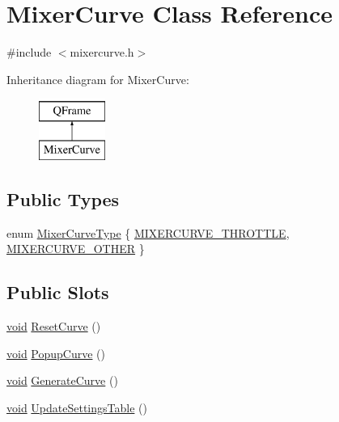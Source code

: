 \hypertarget{class_mixer_curve}{\section{Mixer\-Curve Class Reference}
\label{class_mixer_curve}
}


{\ttfamily \#include $<$mixercurve.\-h$>$}

Inheritance diagram for Mixer\-Curve\-:\begin{figure}[H]
\begin{center}
\leavevmode
\includegraphics[height=2.000000cm]{class_mixer_curve}
\end{center}
\end{figure}
\subsection*{Public Types}
\begin{DoxyCompactItemize}
\item 
enum \hyperlink{group___config_plugin_ga58a5506035df5fabbf4feffb36632595}{Mixer\-Curve\-Type} \{ \hyperlink{group___config_plugin_gga58a5506035df5fabbf4feffb36632595a7dbbc543ccc2e9b4f8ba98d66717a836}{M\-I\-X\-E\-R\-C\-U\-R\-V\-E\-\_\-\-T\-H\-R\-O\-T\-T\-L\-E}, 
\hyperlink{group___config_plugin_gga58a5506035df5fabbf4feffb36632595adc44b10adb428e4fdde5f964bbc339b8}{M\-I\-X\-E\-R\-C\-U\-R\-V\-E\-\_\-\-O\-T\-H\-E\-R}
 \}
\end{DoxyCompactItemize}
\subsection*{Public Slots}
\begin{DoxyCompactItemize}
\item 
\hyperlink{group___u_a_v_objects_plugin_ga444cf2ff3f0ecbe028adce838d373f5c}{void} \hyperlink{group___config_plugin_ga73b9d64b4c71bd3de1266b66707f8e3a}{Reset\-Curve} ()
\item 
\hyperlink{group___u_a_v_objects_plugin_ga444cf2ff3f0ecbe028adce838d373f5c}{void} \hyperlink{group___config_plugin_gaec9845f3048d0bb15ba6b31f4659888f}{Popup\-Curve} ()
\item 
\hyperlink{group___u_a_v_objects_plugin_ga444cf2ff3f0ecbe028adce838d373f5c}{void} \hyperlink{group___config_plugin_gad1f7dbb9fdd65436b5886e20fa930d27}{Generate\-Curve} ()
\item 
\hyperlink{group___u_a_v_objects_plugin_ga444cf2ff3f0ecbe028adce838d373f5c}{void} \hyperlink{group___config_plugin_gad4cb5385cbf5e389acf3fd394601df07}{Update\-Settings\-Table} ()
\end{DoxyCompactItemize}
